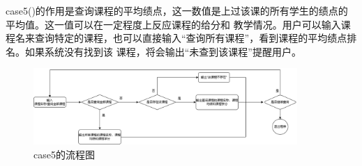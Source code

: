 \documentclass[fontset=windows]{article}
\begin{document}
case5()的作用是查询课程的平均绩点，这一数值是上过该课的所有学生的绩点的平均值。这一值可以在一定程度上反应课程的给分和
教学情况。用户可以输入课程名来查询特定的课程，也可以直接输入“查询所有课程”，看到课程的平均绩点排名。如果系统没有找到该
课程，将会输出“未查到该课程”提醒用户。
\begin{figure}[h!]
	\begin{center}
		\vspace{0.5cm}
		\includegraphics[width = 10cm]{case5.png}
		\vspace{0.5cm}
		\caption{case5的流程图}
	\end{center}
\end{figure}
\newpage
\end{document}
